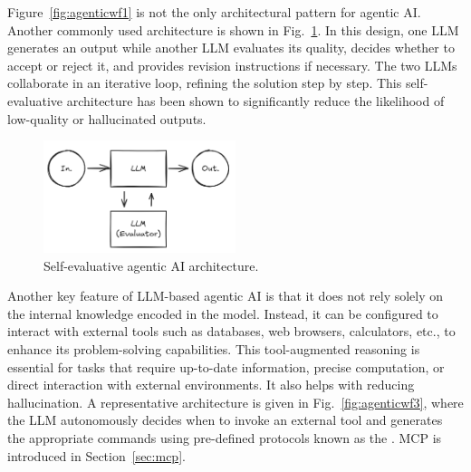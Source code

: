 Figure~\ref{fig:agenticwf1} is not the only architectural pattern for agentic AI. Another commonly used architecture is shown in Fig.~\ref{fig:agenticwf2}. In this design, one LLM generates an output while another LLM evaluates its quality, decides whether to accept or reject it, and provides revision instructions if necessary. The two LLMs collaborate in an iterative loop, refining the solution step by step. This self-evaluative architecture has been shown to significantly reduce the likelihood of low-quality or hallucinated outputs.

\begin{figure}[!htb]
	\centering
	\includegraphics[width=0.5\textwidth]{./chapters/part-4/figures/agenticaiworkflow2.png}
	\caption{Self-evaluative agentic AI architecture.}
	\label{fig:agenticwf2}
\end{figure}

Another key feature of LLM-based agentic AI is that it does not rely solely on the internal knowledge encoded in the model. Instead, it can be configured to interact with external tools such as databases, web browsers, calculators, etc., to enhance its problem-solving capabilities. This tool-augmented reasoning is essential for tasks that require up-to-date information, precise computation, or direct interaction with external environments. It also helps with reducing hallucination. A representative architecture is given in Fig.~\ref{fig:agenticwf3}, where the LLM autonomously decides when to invoke an external tool and generates the appropriate commands using pre-defined protocols known as the . MCP is introduced in Section~\ref{sec:mcp}.

